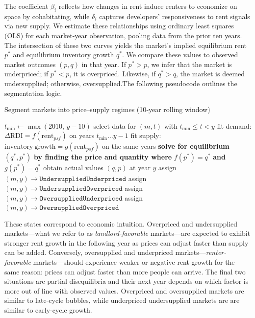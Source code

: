 \documentclass[APA,Times1COL]{WileyNJDv5} %
\begin{document}
The coefficient \( \beta_i \) reflects how changes in rent induce renters to economize on space by cohabitating, while \( \delta_i \) captures developers' responsiveness to rent signals via new supply. We estimate these relationships using ordinary least squares (OLS) for each market-year observation, pooling data from the prior ten years. The intersection of these two curves yields the market's implied equilibrium rent \( p^* \) and equilibrium inventory growth \( q^* \). We compare these values to observed market outcomes \( (p, q) \) in that year. If \( p^* > p \), we infer that the market is underpriced; if \( p^* < p \), it is overpriced. Likewise, if \( q^* > q \), the market is deemed undersupplied; otherwise, oversupplied.The following pseudocode outlines the segmentation logic.
\FloatBarrier
\begin{algorithm}
	\caption{\enskip Segment markets into price–supply regimes (10‑year rolling window)}%
	\label{alg:market_segmentation}
	\begin{algorithmic}[1]
		\State $t_{\min}\gets \max(2010,\,y-10)$
		\State select data for $(m,t)$ with $t_{\min}\le t < y$
		\State fit demand: $\Delta\mathrm{RDI} = f(\mathrm{rent}_{psf})$ on years $t_{\min}\ldots y-1$
		\State fit supply: $\mathrm{inventory\ growth} = g(\mathrm{rent}_{psf})$ on the same years
		\State \textbf{solve for equilibrium} $(q^*,p^*)$ \textbf{by finding the price and quantity where}
		$f(p^*) = q^*$ \textbf{and} $g(p^*) = q^*$
		\State obtain actual values $(q,p)$ at year $y$
		\State assign $(m,y)\to\texttt{UndersuppliedUnderpriced}$
		\Else
		\State assign $(m,y)\to\texttt{UndersuppliedOverpriced}$
		\EndIf
		\Else
		\State assign $(m,y)\to\texttt{OversuppliedUnderpriced}$
		\Else
		\State assign $(m,y)\to\texttt{OversuppliedOverpriced}$
		\EndIf
		\EndIf
		\EndFor
		\EndFor
	\end{algorithmic}
\end{algorithm}
\FloatBarrier
These states correspond to economic intuition. Overpriced and undersupplied markets---what we refer to as \textit{landlord-favorable} markets---are expected to exhibit stronger rent growth in the following year as prices can adjust faster than supply can be added. Conversely, oversupplied and underpriced markets---\textit{renter-favorable} markets---should experience weaker or negative rent growth for the same reason: prices can adjust faster than more people can arrive. The final two situations are partial disequilibria and their next year depends on which factor is more out of line with observed values. Overpriced and oversupplied markets are similar to late-cycle bubbles, while underpriced undersupplied markets are are similar to early-cycle growth. 
\end{document}

